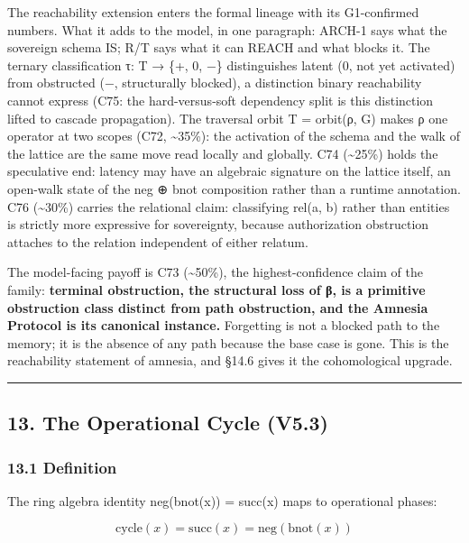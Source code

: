 \documentclass[
]{article}
\begin{document}
The reachability extension enters the formal lineage with its
G1-confirmed numbers. What it adds to the model, in one paragraph:
ARCH-1 says what the sovereign schema IS; R/T says what it can REACH and
what blocks it. The ternary classification τ: T → \{+, 0, −\}
distinguishes latent (0, not yet activated) from obstructed (−,
structurally blocked), a distinction binary reachability cannot express
(C75: the hard-versus-soft dependency split is this distinction lifted
to cascade propagation). The traversal orbit T = orbit(ρ, G) makes ρ one
operator at two scopes (C72, \textasciitilde35\%): the activation of the
schema and the walk of the lattice are the same move read locally and
globally. C74 (\textasciitilde25\%) holds the speculative end: latency
may have an algebraic signature on the lattice itself, an open-walk
state of the neg ⊕ bnot composition rather than a runtime annotation.
C76 (\textasciitilde30\%) carries the relational claim: classifying
rel(a, b) rather than entities is strictly more expressive for
sovereignty, because authorization obstruction attaches to the relation
independent of either relatum.

The model-facing payoff is C73 (\textasciitilde50\%), the
highest-confidence claim of the family: \textbf{terminal obstruction,
the structural loss of β, is a primitive obstruction class distinct from
path obstruction, and the Amnesia Protocol is its canonical instance.}
Forgetting is not a blocked path to the memory; it is the absence of any
path because the base case is gone. This is the reachability statement
of amnesia, and §14.6 gives it the cohomological upgrade.

\begin{center}\rule{0.5\linewidth}{0.5pt}\end{center}

\subsection{13. The Operational Cycle
(V5.3)}\label{the-operational-cycle-v5.3}

\subsubsection{13.1 Definition}\label{definition-4}

The ring algebra identity neg(bnot(x)) = succ(x) maps to operational
phases:

\[\text{cycle}(x) = \text{succ}(x) = \text{neg}(\text{bnot}(x))\]
\end{document}
